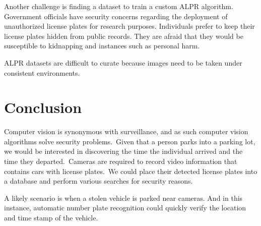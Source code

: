 \documentclass[a4paper,twoside,10pt]{report}
\begin{document}
Another challenge is finding a dataset to train a custom ALPR algorithm. Government officials have security concerns regarding the deployment of unauthorized license plates for research purposes. Individuals prefer to keep their license plates hidden from public records. They are afraid that they would be susceptible to kidnapping and instances such as personal harm. 

ALPR datasets are difficult to curate because images need to be taken under consistent environments.
 
\chapter{Conclusion}
Computer vision is synonymous with surveillance, and as such computer vision algorithms solve security problems.\ 
Given that a person parks into a parking lot, we would be interested in discovering the time the individual arrived and the time they departed.\
Cameras are required to record video information that contains cars with license plates.\ 
We could place their detected license plates into a database and perform various searches for security reasons.\ 

A likely scenario is when a stolen vehicle is parked near cameras. And in this instance, automatic number plate recognition could quickly verify the location and time stamp of the vehicle.

\nocite{*}

\end{document}
